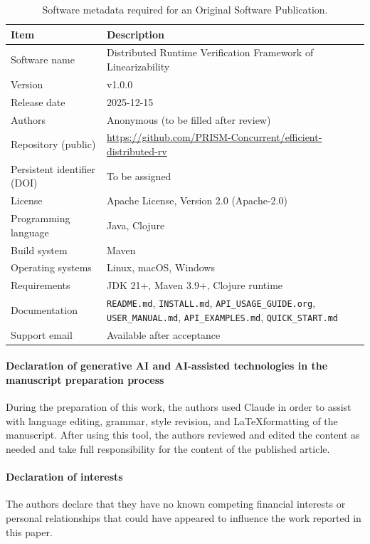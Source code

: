 \documentclass[preprint,12pt]{elsarticle}
\begin{document}
\begin{table}[H]
\centering
\small
\begin{tabular}{p{} p{}}
\hline
\textbf{Item} & \textbf{Description} \\
\hline
Software name & Distributed Runtime Verification Framework of Linearizability\\
Version & v1.0.0 \\
Release date & 2025-12-15 \\
Authors & Anonymous (to be filled after review) \\
Repository (public) & \url{https://github.com/PRISM-Concurrent/efficient-distributed-rv} \\
Persistent identifier (DOI) & To be assigned \\
License & Apache License, Version 2.0 (Apache-2.0) \\
Programming language & Java, Clojure \\
Build system & Maven \\
Operating systems & Linux, macOS, Windows \\
Requirements & JDK 21+, Maven 3.9+, Clojure runtime \\
Documentation & \texttt{README.md}, \texttt{INSTALL.md}, \texttt{API\_USAGE\_GUIDE.org}, \texttt{USER\_MANUAL.md}, \texttt{API\_EXAMPLES.md}, \texttt{QUICK\_START.md} \\
Support email & Available after acceptance \\ %
\hline
\end{tabular}
\caption{Software metadata required for an Original Software Publication.}
\label{tab:software-metadata}
\end{table}

\paragraph{Declaration of generative AI and AI-assisted technologies in the manuscript
preparation process} 
During the preparation of this work, the authors used
Claude in order to assist with language editing, grammar, style revision,
and \LaTeX formatting of the manuscript. After using this tool, the authors
reviewed and edited the content as needed and take full responsibility for the
content of the published article.


\paragraph{Declaration of interests} 
The authors declare that they have 
no known competing financial interests or 
personal relationships that could have appeared to 
influence the work reported in this paper.



\end{document}

